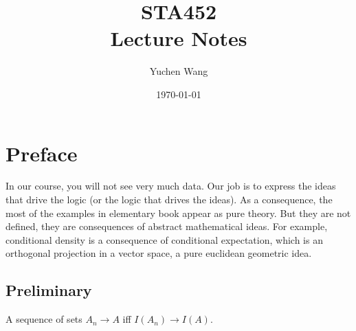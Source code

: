 \documentclass[11pt]{article}
\title{STA452\\ Lecture Notes}
\author{Yuchen Wang}
\date{\today}
\numberwithin{equation}{section}
\begin{document}
    \maketitle
    \tableofcontents
    \newpage
\section{Preface}
In our course, you will not see very much data. Our job is to express the ideas that drive the logic (or the logic that drives the ideas). As a consequence, the most of the examples in elementary book appear as pure theory. But they are not defined, they are consequences of abstract mathematical ideas.
For example, conditional density is a consequence of conditional expectation, which is an orthogonal projection in a vector space, a pure euclidean geometric idea.

\subsection{Preliminary}
A sequence of sets $A_n \rightarrow A$ iff $I(A_n) \rightarrow I(A)$.
\remark
\end{document}
